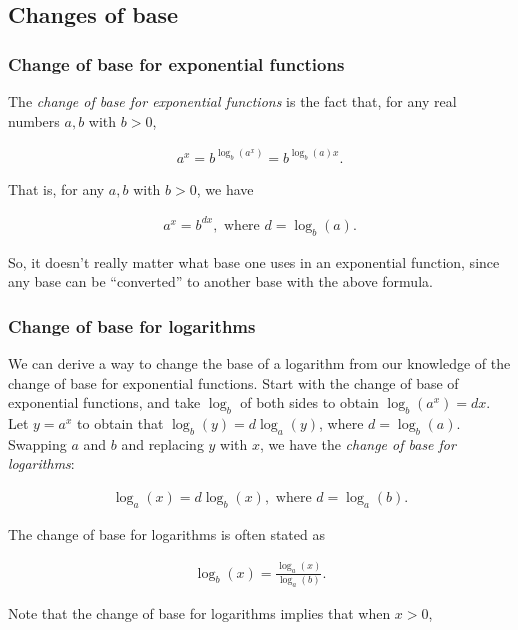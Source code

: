 \subsection*{Changes of base}

\subsubsection*{Change of base for exponential functions}

The \textit{change of base for exponential functions} is the fact that, for any real numbers $a, b$ with $b > 0$,

\begin{align*}
    a^x = b^{\log_b(a^x)} = b^{\log_b(a) x}.
\end{align*}

That is, for any $a, b$ with $b > 0$, we have

\begin{align*}
    a^x = b^{dx}, \text{ where $d = \log_b(a)$}.
\end{align*}

So, it doesn't really matter what base one uses in an exponential function, since any base can be ``converted'' to another base with the above formula.

\subsubsection*{Change of base for logarithms}

We can derive a way to change the base of a logarithm from our knowledge of the change of base for exponential functions. Start with the change of base of exponential functions, and take $\log_b$ of both sides to obtain $\log_b(a^x) = dx$. Let $y = a^x$ to obtain that ${\log_b(y) = d\log_a(y)}$, where $d = \log_b(a)$. Swapping $a$ and $b$ and replacing $y$ with $x$, we have the \textit{change of base for logarithms}:

\begin{align*}
    \log_a(x) = d\log_b(x), \text{ where $d = \log_a(b)$}.
\end{align*}

The change of base for logarithms is often stated as

\begin{align*}
    \log_b(x) = \frac{\log_a(x)}{\log_a(b)}.
\end{align*}

Note that the change of base for logarithms implies that when $x > 0$,

